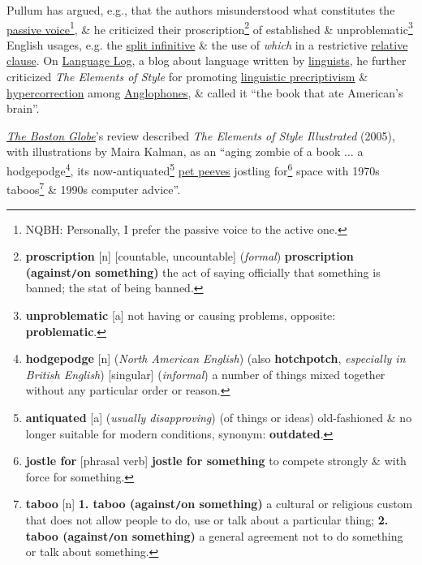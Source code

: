\documentclass{article}
\begin{document}
Pullum has argued, e.g., that the authors misunderstood what constitutes the \href{https://en.wikipedia.org/wiki/English_passive_voice}{passive voice}\footnote{NQBH: Personally, I prefer the passive voice to the active one.}, \& he criticized their proscription\footnote{{\bf proscription} [n] [countable, uncountable] ({\it formal}) {\bf proscription (against{\tt/}on something)} the act of saying officially that something is banned; the stat of being banned.} of established \& unproblematic\footnote{{\bf unproblematic} [a] not having or causing problems, {\sc opposite}: {\bf problematic}.} English usages, e.g. the \href{https://en.wikipedia.org/wiki/Split_infinitive}{split infinitive} \& the use of {\it which} in a restrictive \href{https://en.wikipedia.org/wiki/English_relative_clause#That_or_which}{relative clause}. On \href{https://en.wikipedia.org/wiki/Language_Log}{Language Log}, a blog about language written by \href{https://en.wikipedia.org/wiki/Linguists}{linguists}, he further criticized {\it The Elements of Style} for promoting \href{https://en.wikipedia.org/wiki/Linguistic_prescriptivism}{linguistic precriptivism} \& \href{https://en.wikipedia.org/wiki/Hypercorrection}{hypercorrection} among \href{https://en.wikipedia.org/wiki/Anglophones}{Anglophones}, \& called it ``the book that ate American's brain''.

\href{https://en.wikipedia.org/wiki/The_Boston_Globe}{{\it The Boston Globe}}'s review described {\it The Elements of Style Illustrated} (2005), with illustrations by Maira Kalman, as an ``aging zombie of a book $\ldots$ a hodgepodge\footnote{{\bf hodgepodge} [n] ({\it North American English}) (also {\bf hotchpotch}, {\it especially in British English}) [singular] ({\it informal}) a number of things mixed together without any particular order or reason.}, its now-antiquated\footnote{{\bf antiquated} [a] ({\it usually disapproving}) (of things or ideas) old-fashioned \& no longer suitable for modern conditions, {\sc synonym}: {\bf outdated}.} \href{https://en.wikipedia.org/wiki/Pet_peeve}{pet peeves} jostling for\footnote{{\bf jostle for} [phrasal verb] {\bf jostle for something} to compete strongly \& with force for something.} space with 1970s taboos\footnote{{\bf taboo} [n] {\bf 1. taboo (against{\tt/}on something)} a cultural or religious custom that does not allow people to do, use or talk about a particular thing; {\bf 2. taboo (against{\tt/}on something)} a general agreement not to do something or talk about something.} \& 1990s computer advice''.
\end{document}
